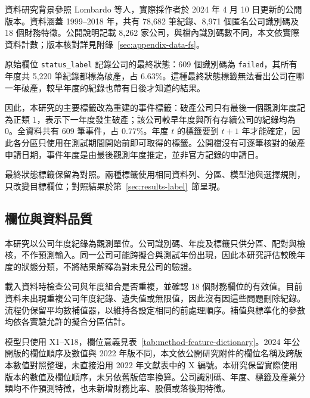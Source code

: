 資料研究背景參照 Lombardo 等人\autocite{lombardo2022bankruptcy}，實際採作者於 2024 年 4 月 10 日更新的公開版本\autocite{sowide-bankruptcy-data}。資料涵蓋 1999--2018 年，共有 78,682 筆紀錄、8,971 個匿名公司識別碼及 18 個財務特徵。公開說明記載 8,262 家公司，與檔內識別碼數不同，本文依實際資料計數；版本核對詳見附錄~\ref{sec:appendix-data-fs}。

原始欄位 \nolinkurl{status_label} 記錄公司的最終狀態：609 個識別碼為 \nolinkurl{failed}，其所有年度共 5,220 筆紀錄都標為破產，占 6.63\%。這種最終狀態標籤無法看出公司在哪一年破產，較早年度的紀錄也帶有日後才知道的結果。

因此，本研究的主要標籤改為重建的事件標籤：破產公司只有最後一個觀測年度記為正類 1，表示下一年度發生破產；該公司較早年度與所有存續公司的紀錄均為 0。全資料共有 609 筆事件，占 0.77\%。年度 \(t\) 的標籤要到 \(t+1\) 年才能確定，因此各分區只使用在測試期間開始前即可取得的標籤。公開檔沒有可逐筆核對的破產申請日期，事件年度是由最後觀測年度推定，並非官方記錄的申請日。

最終狀態標籤保留為對照。兩種標籤使用相同資料列、分區、模型池與選擇規則，只改變目標欄位；對照結果於第~\ref{sec:results-label}~節呈現。

\subsection{欄位與資料品質}

本研究以公司年度紀錄為觀測單位。公司識別碼、年度及標籤只供分區、配對與檢核，不作預測輸入。同一公司可能跨擬合與測試年份出現，因此本研究評估較晚年度的狀態分類，不將結果解釋為對未見公司的驗證。

載入資料時檢查公司與年度組合是否重複，並確認 18 個財務欄位的有效值。目前資料未出現重複公司年度紀錄、遺失值或無限值，因此沒有因這些問題刪除紀錄。流程仍保留平均數補值器，以維持各設定相同的前處理順序。補值與標準化的參數均依各實驗允許的擬合分區估計。

模型只使用 X1--X18，欄位意義見表~\ref{tab:method-feature-dictionary}。2024 年公開版的欄位順序及數值與 2022 年版不同，本文依公開研究附件的欄位名稱及跨版本數值對照整理，未直接沿用 2022 年文獻表中的 X 編號\autocite{sowide-financial-supplement}。本研究保留實際使用版本的數值及欄位順序，未另依舊版倍率換算。公司識別碼、年度、標籤及產業分類均不作預測特徵，也未新增財務比率、股價或落後期特徵。

